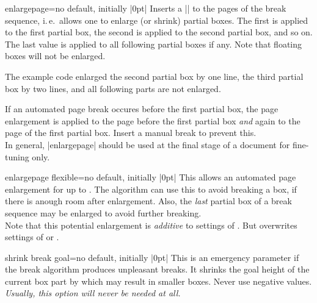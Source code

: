 \begin{docTcbKey}{enlargepage}{=}{no default, initially |0pt|}
  Inserts a |\enlargethispage| to the pages of the break sequence,
  i.\,e.\ allows one to enlarge (or shrink) partial boxes. The first  is applied
  to the first partial box, the second  is applied
  to the second partial box, and so on. The last  value is applied
  to all following partial boxes if any. Note that floating boxes will not be enlarged.
\begin{dispListing}
\begin{tcolorbox}[breakable,enlargepage=0mm/\baselineskip/2\baselineskip/0mm,...
\end{dispListing}
  The example code enlarged the second partial box by one line, the third
  partial box by two lines, and all following parts are not enlarged.
  \begin{marker}
  If an automated page break occures before the first partial box, the
  page enlargement is applied to the page before the first partial box \emph{and}
  again to the page of the first partial box. Insert a manual break to prevent this.\\
  In general, |enlargepage| should be used at the final stage of a document
  for fine-tuning only.
  \end{marker}
\end{docTcbKey}

\clearpage
\begin{docTcbKey}{enlargepage flexible}{=}{no default, initially |0pt|}
  This allows an automated page enlargement for up to .
  The algorithm can use this to avoid breaking a box, if there is anough room
  after enlargement. Also, the \emph{last} partial box of a break sequence
  may be enlarged to avoid further breaking.\\
  Note that this potential enlargement is \emph{additive} to settings of
  .
  But  overwrites settings of
   or .
\begin{dispListing}
\end{dispListing}
\end{docTcbKey}



\begin{docTcbKey}{shrink break goal}{=}{no default, initially |0pt|}
  This is an emergency parameter if the break algorithm produces unpleasant
  breaks.
  It shrinks the goal height of the current box part by 
  which may result in smaller boxes. Never use negative values.
  \emph{Usually, this option will never be needed at all.}
\end{docTcbKey}


